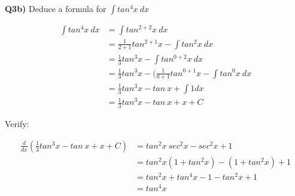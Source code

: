 \documentclass[9pt]{article}
\begin{document}
\begin{tcolorbox}
  \textbf{Q3b)} Deduce a formula for $\int tan^4 x \ dx$
\end{tcolorbox}

\begin{align*}
  \int tan^4 x \ dx &= \int tan^{2+2} x \ dx \\
  &= \frac{1}{2 + 1} tan^{2+1} x - \int tan^2 x \ dx \\
  &= \frac{1}{3} tan^3 x - \int tan^{0+2} x \ dx \\
  &= \frac{1}{3} tan^3 x - (\frac{1}{0+1} tan^{0+1} x - \int tan^0 x \ dx \\
  &= \frac{1}{3} tan^3 x - tan \ x + \int 1 dx \\
  &= \frac{1}{3} tan^3 x - tan \ x + x + C
\end{align*}

Verify:

\begin{align*}
  \frac{d}{dx}(\frac{1}{3} tan^3 x - tan \ x + x + C) &= tan^2 x \ sec^2 x - sec^2 x + 1 \\
  &= tan^2 x (1 + tan^2 x) - (1 + tan^2 x ) + 1 \\
  &= tan^2 x + tan^4 x - 1 - tan^2 x + 1 \\
  &= tan^4 x
\end{align*}
\end{document}
